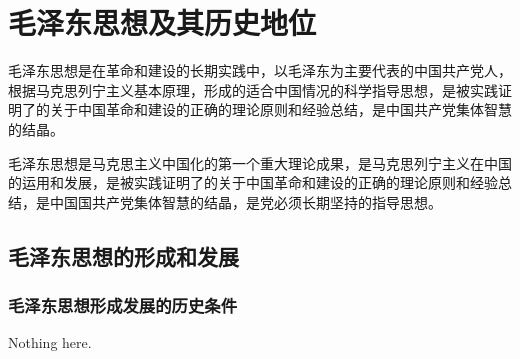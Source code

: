 \chapter{毛泽东思想及其历史地位}
\par 毛泽东思想是在革命和建设的长期实践中，以毛泽东为主要代表的中国共产党人，根据马克思列宁主义基本原理，形成的适合中国情况的科学指导思想，是被实践证明了的关于中国革命和建设的正确的理论原则和经验总结，是中国共产党集体智慧的结晶。

\par 毛泽东思想是马克思主义中国化的第一个重大理论成果，是马克思列宁主义在中国的运用和发展，是被实践证明了的关于中国革命和建设的正确的理论原则和经验总结，是中国国共产党集体智慧的结晶，是党必须长期坚持的指导思想。


\section{毛泽东思想的形成和发展}

    \subsection{毛泽东思想形成发展的历史条件}
    Nothing here.

